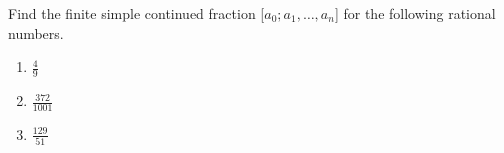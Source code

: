 \documentclass{article}
\begin{document}

\begin{problem}{}{}
    \color{CtpText}
    Find the finite simple continued fraction [$a_0;a_1,\dots,a_n$] for the following rational numbers.
    \begin{enumerate}[label=\textbf{\arabic*}.]
        \item $\frac{4}{9}$
        \item $\frac{372}{1001}$
        \item $\frac{129}{51}$
    \end{enumerate}
\end{problem}
\end{document}
